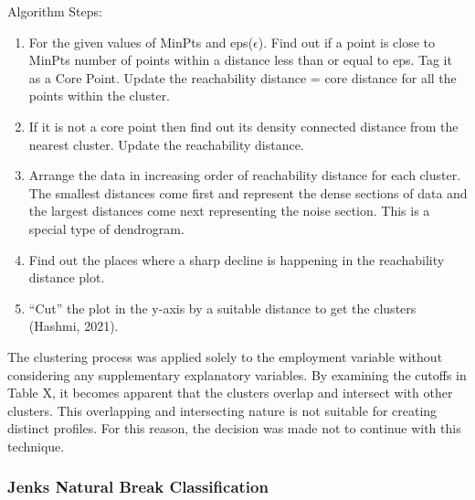 \documentclass[11pt, a4paper]{article}
\begin{document}
Algorithm Steps:
\begin{enumerate}
\item For the given values of MinPts and eps($\epsilon$). Find out if a point is close to MinPts number of points within a distance less than or equal to eps. Tag it as a Core Point. Update the reachability distance = core distance for all the points within the cluster.
\item If it is not a core point then find out its density connected distance from the nearest cluster. Update the reachability distance.
\item Arrange the data in increasing order of reachability distance for each cluster. The smallest distances come first and represent the dense sections of data and the largest distances come next representing the noise section. This is a special type of dendrogram.
\item Find out the places where a sharp decline is happening in the reachability distance plot.
\item ``Cut'' the plot in the y-axis by a suitable distance to get the clusters (Hashmi, 2021).
\end{enumerate}

The clustering process was applied solely to the employment variable without considering any supplementary explanatory variables. By examining the cutoffs in Table X, it becomes apparent that the clusters overlap and intersect with other clusters. This overlapping and intersecting nature is not suitable for creating distinct profiles. For this reason, the decision was made not to continue with this technique.






\subsubsection{Jenks Natural Break Classification}
\end{document}
